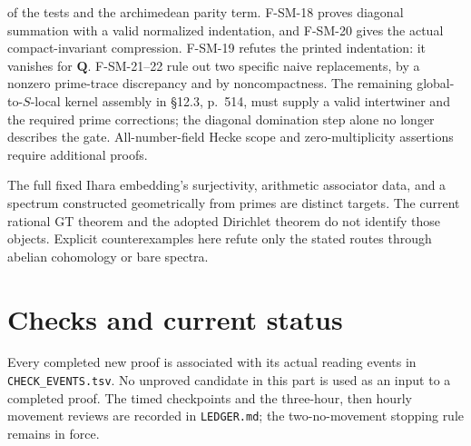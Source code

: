 \documentclass[11pt,a4paper]{article}
\theoremstyle{definition}\newtheorem{definition}[theorem]{Definition}
\theoremstyle{remark}\newtheorem{remark}[theorem]{Remark}
\begin{document}
\begin{description}[style=nextline,leftmargin=0pt,labelwidth=0pt,labelsep=0pt]
of the tests and the archimedean parity term. F-SM-18 proves diagonal summation with a valid normalized indentation,
and F-SM-20 gives the actual compact-invariant compression. F-SM-19
refutes the printed indentation: it vanishes for $\mathbf Q$.
F-SM-21--22 rule out two specific naive replacements, by a nonzero
prime-trace discrepancy and by noncompactness. The remaining
global-to-$S$-local kernel assembly in \S12.3, p.~514, must supply
a valid intertwiner and the required prime corrections; the
diagonal domination step alone no longer describes the gate. All-number-field Hecke scope and
zero-multiplicity assertions require additional proofs.
\item[Profinite GT, anabelian reconstruction and geometric spectra.]
The full fixed Ihara embedding's surjectivity, arithmetic associator
data, and a spectrum constructed geometrically from primes are distinct
targets. The current rational GT theorem and the adopted Dirichlet
theorem do not identify those objects. Explicit counterexamples here
refute only the stated routes through abelian cohomology or bare spectra.
\end{description}

\section{Checks and current status}
Every completed new proof is associated with its actual reading events
in \nolinkurl{CHECK_EVENTS.tsv}. No unproved candidate in this part is
used as an input to a completed proof. The timed checkpoints and the
three-hour, then hourly movement reviews are recorded in
\nolinkurl{LEDGER.md}; the two-no-movement stopping rule remains in force.
\clearpage
\end{document}
